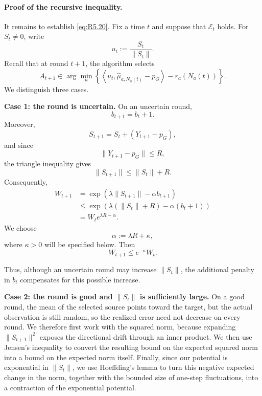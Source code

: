\documentclass[twoside]{article}
\begin{document}
\paragraph{Proof of the recursive inequality.}


It remains to establish \eqref{eq:R5.20}. Fix a time \(t\) and suppose that
\(\mathcal E_t\) holds. For \(S_t\neq0\), write
\[
    u_t:=\frac{S_t}{\|S_t\|}.
\]
Recall that at round \(t+1\), the algorithm selects
\[
    A_{t+1}
    \in
    \arg\min_{a}
    \left\{
        \left\langle
            u_t,
            \widehat\mu_{a,N_a(t)}-p_G
        \right\rangle
        -
        r_a\!\left(N_a(t)\right)
    \right\}.
\]
We distinguish three
cases.

\medskip

\noindent
\textbf{Case 1: the round is uncertain.} On an uncertain round,
\[
    b_{t+1}=b_t+1.
\]
Moreover,
\[
    S_{t+1}
    =
    S_t+(Y_{t+1}-p_G),
\]
and since
\[
    \|Y_{t+1}-p_G\|\le R,
\]
the triangle inequality gives
\[
    \|S_{t+1}\|
    \le
    \|S_t\|+R.
\]
Consequently,
\[
\begin{aligned}
    W_{t+1}
    &=
    \exp\left(
        \lambda\|S_{t+1}\|-\alpha b_{t+1}
    \right)
    \\
    &\le
    \exp\left(
        \lambda(\|S_t\|+R)-\alpha(b_t+1)
    \right)
    \\
    &=
    W_t e^{\lambda R-\alpha}.
\end{aligned}
\]
We choose
\begin{equation}
    \alpha
    :=
    \lambda R+\kappa,
    \tag{R5.26}
    \label{eq:R5.26}
\end{equation}
where \(\kappa>0\) will be specified below. Then
\begin{equation}
    W_{t+1}
    \le
    e^{-\kappa}W_t.
    \tag{R5.27}
    \label{eq:R5.27}
\end{equation}

Thus, although an uncertain round may increase \(\|S_t\|\), the additional
penalty in \(b_t\) compensates for this possible increase.

\medskip

\noindent
\textbf{Case 2: the round is good and \(\|S_t\|\) is sufficiently large.} 
On a good round, the mean of the selected source points toward the target, but the
actual observation is still random, so the realized error need not decrease on
every round. We therefore first work with the squared norm, because expanding
\(\|S_{t+1}\|^2\) exposes the directional drift through an inner product.
We then use Jensen's inequality to convert the resulting bound on the expected
squared norm into a bound on the expected norm itself. Finally, since our
potential is exponential in \(\|S_t\|\), we use Hoeffding's lemma to turn this
negative expected change in the norm, together with the bounded size of one-step
fluctuations, into a contraction of the exponential potential.\\
\end{document}
